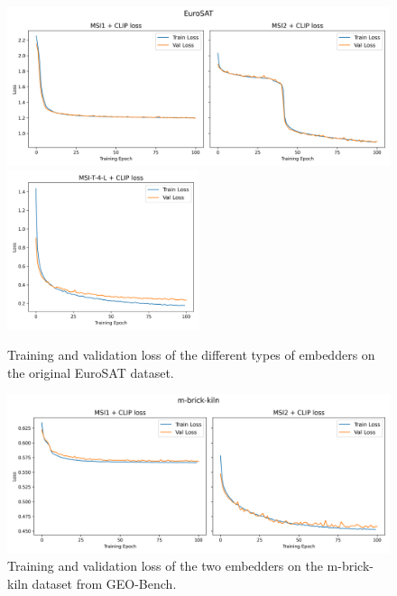 \documentclass[a4paper, twoside, english]{sapthesis} %
\begin{document}
\vspace{-0.3cm}

\begin{figure}[H]
    \centering
    \includegraphics[width=\textwidth]{img/EuroSAT_loss_plot.png}
     \includegraphics[width=0.5\textwidth]{img/EuroSAT_4L_loss_plot.png}
    \caption{\normalsize Training and validation loss of the different types of embedders on the original EuroSAT dataset.}
    \label{fig:eurosatloss}
\end{figure}

\begin{figure}[H]
    \centering
    \includegraphics[width=\textwidth]{img/m-brick-kiln_loss_plot.png}
    \caption{\normalsize Training and validation loss of the two embedders on the m-brick-kiln dataset from GEO-Bench.}
    \label{fig:brickloss}
\end{figure}

\vspace{-0.3cm}
\end{document}
